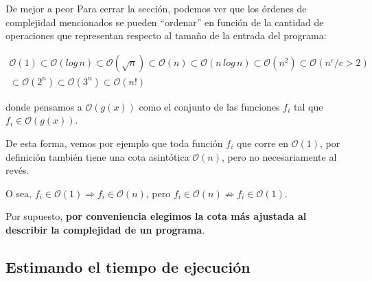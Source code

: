 \documentclass{beamer}
\begin{document}
    \begin{frame}{De mejor a peor}
        Para cerrar la sección, podemos ver que los órdenes de complejidad mencionados se pueden ``ordenar'' en función de la cantidad de operaciones que representan respecto al tamaño de la entrada del programa: \vspace{-15pt} \pause

        \begin{equation*}
            \begin{gathered}
                \mathcal{O}(1) \subset \mathcal{O}(log \, n) \subset \mathcal{O}(\sqrt{n}) \subset \mathcal{O}(n) \subset \mathcal{O}(n \, log \, n) \subset \mathcal{O}(n^2) \subset \mathcal{O}(n^c / c > 2) \\
                 \subset \mathcal{O}(2^n) \subset \mathcal{O}(3^n) \subset \mathcal{O}(n!)
            \end{gathered}
        \end{equation*}\vspace{-10pt}
        \pause

        donde pensamos a $\mathcal{O}(g(x))$ como el conjunto de las funciones $f_i$ tal que $f_i \in \mathcal{O}(g(x))$. \vspace{8pt} \pause

        De esta forma, vemos por ejemplo que toda función $f_i$ que corre en $\mathcal{O}(1)$, por definición también tiene una cota asintótica $\mathcal{O}(n)$, pero no necesariamente al revés. \pause

        O sea, $f_i \in \mathcal{O}(1) \Rightarrow f_i \in \mathcal{O}(n)$, pero $f_i \in \mathcal{O}(n) \not\Rightarrow f_i \in \mathcal{O}(1)$. \vspace{8pt} \pause

        Por supuesto, \textbf{por conveniencia elegimos la cota más ajustada al describir la complejidad de un programa}.
    \end{frame}

    \subsection{Estimando el tiempo de ejecución} 
    \begin{frame}
    \end{frame}
\end{document}

